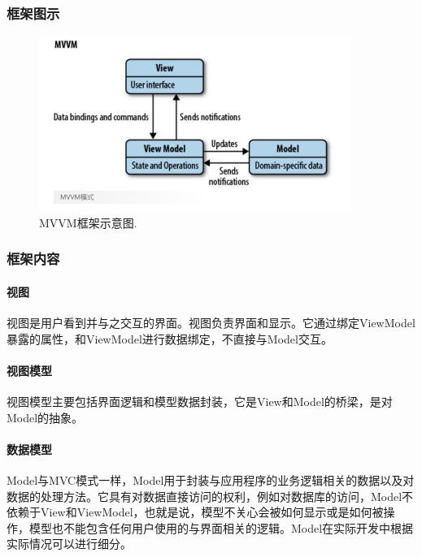 \documentclass[14pt,a4paper]{article}
\begin{document}
\subsubsection{框架图示}
\nopagebreak
\begin{figure}[h]
\begin{center}
\includegraphics[width=0.9\textwidth]{image/mvvm} 
\caption{MVVM框架示意图.}
\end{center}
\end{figure}

\subsubsection{框架内容}

\paragraph*{视图}
视图是用户看到并与之交互的界面。视图负责界面和显示。它通过绑定ViewModel暴露的属性，和ViewModel进行数据绑定，不直接与Model交互。\\

\paragraph*{视图模型}
视图模型主要包括界面逻辑和模型数据封装，它是View和Model的桥梁，是对Model的抽象。

\paragraph*{数据模型}
Model与MVC模式一样，Model用于封装与应用程序的业务逻辑相关的数据以及对数据的处理方法。它具有对数据直接访问的权利，例如对数据库的访问，Model不依赖于View和ViewModel，也就是说，模型不关心会被如何显示或是如何被操作，模型也不能包含任何用户使用的与界面相关的逻辑。Model在实际开发中根据实际情况可以进行细分。
\end{document}
